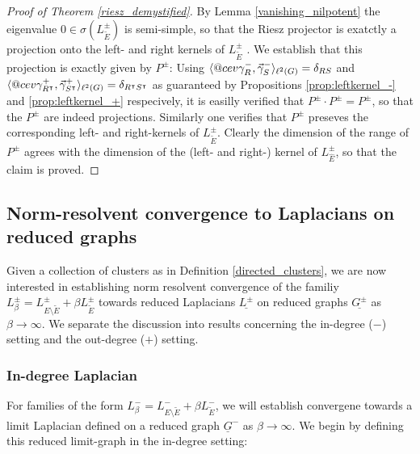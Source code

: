 \documentclass[reqno,12pt,letterpaper]{amsart}
\makeatletter
\numberwithin{equation}{section}
\newcommand{\Lin}{L^{-}}
\newcommand{\Lio}{L^{\pm}}
\DeclareRobustCommand{\cev}[1]{%
	\mathpalette\do@cev{#1}%
}
\newcommand{\do@cev}[2]{%
	\fix@cev{#1}{+}%
	\reflectbox{$\m@th#1\vec{\reflectbox{$\fix@cev{#1}{-}\m@th#1#2\fix@cev{#1}{+}$}}$}%
	\fix@cev{#1}{-}%
}
\newcommand{\fix@cev}[2]{%
	\ifx#1\displaystyle
	\mkern#23mu
	\else
	\ifx#1\textstyle
	\mkern#23mu
	\else
	\ifx#1\scriptstyle
	\mkern#22mu
	\else
	\mkern#22mu
	\fi
	\fi
	\fi
}
\newcommand{\1}{\mathds{1}}
\theoremstyle{definition}
\makeatother
\begin{document}
		
	\begin{proof}[Proof of Theorem \ref{riesz_demystified}]
		By Lemma \ref{vanishing_nilpotent} the eigenvalue $0 \in \sigma( \Lio_{\tilde{E}})$ is semi-simple, so that the Riesz projector is exatctly a projection onto the left- and right kernels of $L^\pm_{\tilde{E}}$ \cite{kato1995perturbation}. We establish that this projection is exactly given by $P^\pm$:
		Using $\langle \cev\gamma^{-}_{R}, \vec\gamma^{-}_{S}\rangle_{\ell^2(G)} = \delta_{RS}$ and  $	\langle \cev\gamma^{+}_{R^\intercal}, \vec\gamma^{+}_{S^\intercal}\rangle_{\ell^2(G)} = \delta_{R^\intercal S^\intercal}$ 
		as guaranteed by Propositions  \ref{prop:leftkernel_-} and   \ref{prop:leftkernel_+} respecively, it is easilly verified that  $P^\pm \cdot P^\pm = P^\pm$,  so that the $P^\pm$ are indeed projections. Similarly one verifies that $P^\pm$ preseves the corresponding left- and right-kernels of $\Lio_{\tilde{E}}$. 		 Clearly the dimension of the range of $P^\pm$ agrees with the dimension of the (left- and right-) kernel of $\Lio_{\hat{E}}$, so that the claim is proved.
		\end{proof}

	
	
	
	
	
	
	
	\subsection{Norm-resolvent convergence to Laplacians on reduced graphs}
	
Given a collection of clusters as in Definition \ref{directed_clusters}, we are now interested in establishing norm resolvent convergence  of the familiy $
	\Lio_\beta = \Lio_{E \setminus \tilde{E}} + \beta \Lio_{\tilde{E}}$ towards reduced  Laplacians $\underline{\Lio}$ on reduced graphs $\underline{G^\pm}$ as $\beta \rightarrow \infty$. We separate the discussion into results concerning the in-degree  ($-$) setting and the out-degree ($+$) setting.

\subsubsection{In-degree Laplacian}
For families of the form $	\Lin_\beta = \Lin_{E \setminus \tilde{E}} + \beta \Lin_{\tilde{E}}$, we will establish convergene towards a limit Laplacian defined on a reduced graph $\underline{G}^-$ as $\beta \rightarrow \infty$. We begin by defining this reduced limit-graph in the in-degree setting:
\end{document}
